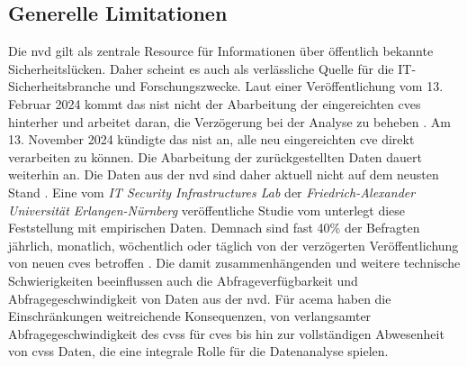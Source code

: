 \subsection{Generelle Limitationen}
\label{limitation-generell}
\par Die \gls{nvd} gilt als zentrale Resource für Informationen über öffentlich bekannte Sicherheitslücken. Daher scheint es auch als verlässliche Quelle für die IT-Sicherheitsbranche und Forschungszwecke. Laut einer Veröffentlichung vom 13. Februar 2024 kommt das \gls{nist} nicht der Abarbeitung der eingereichten \glspl{cve} hinterher und arbeitet daran, die Verzögerung bei der Analyse zu beheben \autocite{NVDProgramAnnouncement}. Am 13. November 2024 kündigte das \gls{nist} an, alle neu eingereichten \gls{cve} direkt verarbeiten zu können. Die Abarbeitung der zurückgestellten Daten dauert weiterhin an. Die Daten aus der \gls{nvd} sind daher aktuell  nicht auf dem neusten Stand \autocite{NationalVulnerabilityDatabase2024}. Eine vom \textit{IT Security Infrastructures Lab} der \textit{Friedrich-Alexander Universität Erlangen-Nürnberg} veröffentliche Studie vom  unterlegt diese Feststellung mit empirischen Daten. Demnach sind fast 40\% der Befragten jährlich, monatlich, wöchentlich oder täglich von der verzögerten Veröffentlichung von neuen \glspl{cve} betroffen \autocite{wunderNVDUsersAttitudes2024}. Die damit zusammenhängenden und weitere technische Schwierigkeiten beeinflussen auch die Abfrageverfügbarkeit und Abfragegeschwindigkeit von Daten aus der \gls{nvd}. Für \gls{acema} haben die Einschränkungen weitreichende Konsequenzen, von verlangsamter Abfragegeschwindigkeit des \gls{cvss} für \glspl{cve} bis hin zur vollständigen Abwesenheit von \gls{cvss} Daten, die eine integrale Rolle für die Datenanalyse spielen.
%
